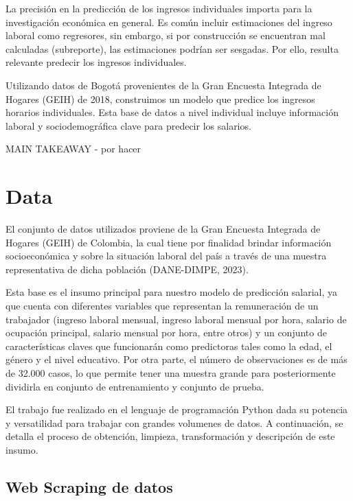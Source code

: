 \documentclass[11pt,oneside]{article}
\begin{document}
	La precisión en la predicción de los ingresos individuales importa para la investigación económica en general. Es común incluir estimaciones del ingreso laboral como regresores, sin embargo, si por construcción se encuentran mal calculadas (subreporte), las estimaciones podrían ser sesgadas. Por ello, resulta relevante predecir los ingresos individuales. 
	
	Utilizando datos de Bogotá provenientes de la Gran Encuesta Integrada de Hogares (GEIH) de 2018, construimos un modelo que predice los ingresos horarios individuales. Esta base de datos a nivel individual incluye información laboral y sociodemográfica clave para predecir los salarios.
	
	MAIN TAKEAWAY - por hacer
	
	\section{Data}
	
	El conjunto de datos utilizados proviene de la Gran Encuesta Integrada de Hogares (GEIH) de Colombia, la cual tiene por finalidad brindar información socioeconómica y sobre la situación laboral del país a través de una muestra representativa de dicha población (DANE-DIMPE, 2023). 
	
	Esta base es el insumo principal para nuestro modelo de predicción salarial, ya que cuenta con diferentes variables que representan la remuneración de un trabajador (ingreso laboral mensual, ingreso laboral mensual por hora, salario de ocupación principal, salario mensual por hora, entre otros) y un conjunto de características claves que funcionarán como predictoras tales como la edad, el género y el nivel educativo. Por otra parte, el número de observaciones es de más de 32.000 casos, lo que permite tener una muestra grande para posteriormente dividirla en conjunto de entrenamiento y conjunto de prueba. 
	
	El trabajo fue realizado en el lenguaje de programación Python dada su potencia y versatilidad para trabajar con grandes volumenes de datos. A continuación, se detalla el proceso de obtención, limpieza, transformación y descripción de este insumo. 
	
	\subsection{Web Scraping de datos}
	
\end{document}
